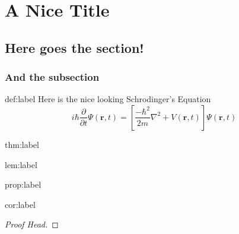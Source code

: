 \documentclass{package/notes}
\begin{document}
\begin{titlepage} %
	
\end{titlepage}
\newpage

\tableofcontents
\chapter{A Nice Title}

\section{Here goes the section!}
\subsection{And the subsection}

\begin{definition}{def:label} %
	\lipsum[1][1-3]
	Here is the nice looking Schrodinger's Equation
	\[i\hbar\frac{\partial}{\partial t} \varPsi(\mathbf{r},t) = \left [ \frac{-\hbar^2}{2m}\nabla^2 + V(\mathbf{r},t)\right ] \varPsi(\mathbf{r},t)\]
\end{definition}

\begin{theorem}{thm:label}%
	\lipsum[2][1-3]
\end{theorem}

\begin{lemma}{lem:label}%
	\lipsum[3][1-3]
\end{lemma}

\begin{proposition}{prop:label}%
	\lipsum[4][1-3]
\end{proposition}

\begin{corollary}{cor:label}%
	\lipsum[5][1-3]
\end{corollary}

\begin{problem}%
	\lipsum[1][1-3]
\end{problem}
\begin{proof}[Proof Head]
	\lipsum[1][1-10]
\end{proof}
\end{document}
